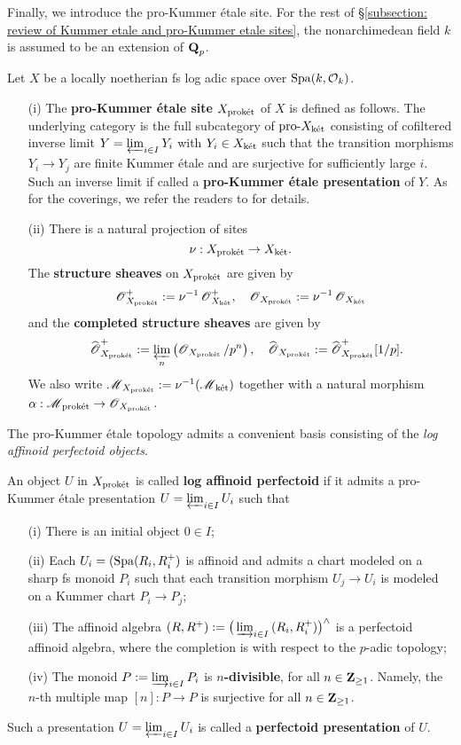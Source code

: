 Finally, we introduce the pro-Kummer \'etale site. For the rest of \S \ref{subsection: review of Kummer etale and pro-Kummer etale sites}, the nonarchimedean field $k$ is assumed to be an extension of $\operatorname{\mathbf{Q}}_p$. 
\begin{Definition}
Let $X$ be a locally noetherian fs log adic space over $\operatorname{Spa}(k,\operatorname{\mathcal{O}}_k)$.
\begin{enumerate}
\item[(i)] The \textbf{pro-Kummer \'{e}tale site} $X_{\operatorname{\textrm{prok\'{e}t}}}$ of $X$ is defined as follows. The underlying category is the full subcategory of $\textrm{pro-}X_{\operatorname{\textrm{k\'{e}t}}}$ consisting of cofiltered inverse limit $Y=\varprojlim_{i\in I}Y_i$ with $Y_i\in X_{\operatorname{\textrm{k\'{e}t}}}$ such that the transition morphisms $Y_i\rightarrow Y_j$ are finite Kummer \'{e}tale and are surjective for sufficiently large $i$. Such an inverse limit if called a \textbf{pro-Kummer \'etale presentation} of $Y$. As for the coverings, we refer the readers to \cite[Definition 5.1.1, 5.1.2]{Diao} for details.
\item[(ii)] There is a natural projection of sites \[\nu: X_{\operatorname{\textrm{prok\'{e}t}}}\rightarrow X_{\operatorname{\textrm{k\'{e}t}}}.\] The \textbf{structure sheaves} on $X_{\operatorname{\textrm{prok\'{e}t}}}$ are given by
$$
\operatorname{\mathscr{O}}_{X_{\operatorname{\textrm{prok\'{e}t}}}}^+:=\nu^{-1}\operatorname{\mathscr{O}}_{X_{\operatorname{\textrm{k\'{e}t}}}}^+, \quad \operatorname{\mathscr{O}}_{X_{\operatorname{\textrm{prok\'{e}t}}}}:=\nu^{-1}\operatorname{\mathscr{O}}_{X_{\operatorname{\textrm{k\'{e}t}}}}$$
and the \textbf{completed structure sheaves} are given by
$$
\quad \widehat{\operatorname{\mathscr{O}}}_{X_{\operatorname{\textrm{prok\'{e}t}}}}^+:=\varprojlim_{n}\left(\operatorname{\mathscr{O}}_{X_{\operatorname{\textrm{prok\'{e}t}}}}/p^n\right), \quad \widehat{\operatorname{\mathscr{O}}}_{X_{\operatorname{\textrm{prok\'{e}t}}}}:=\widehat{\operatorname{\mathscr{O}}}_{X_{\operatorname{\textrm{prok\'{e}t}}}}^+[1/p].
$$
We also write $\operatorname{\mathscr{M}}_{X_{\operatorname{\textrm{prok\'{e}t}}}}:=\nu^{-1}(\operatorname{\mathscr{M}}_{\operatorname{\textrm{k\'{e}t}}})$ together with a natural morphism $\alpha:\operatorname{\mathscr{M}}_{\operatorname{\textrm{prok\'{e}t}}}\rightarrow \operatorname{\mathscr{O}}_{X_{\operatorname{\textrm{prok\'{e}t}}}}$.
\end{enumerate}
\end{Definition}
The pro-Kummer \'etale topology admits a convenient basis consisting of the \emph{log affinoid perfectoid objects}.

\begin{Definition}
An object $U$ in $X_{\operatorname{\textrm{prok\'{e}t}}}$ is called \textbf{log affinoid perfectoid} if it admits a pro-Kummer \'etale presentation $U = \varprojlim_{i \in I} U_i$ such that
\begin{enumerate}
 \item[(i)] There is an initial object $0 \in I$;
 \item[(ii)] Each $U_i= (\operatorname{Spa}(R_i, R_i^+)$ is affinoid and admits a chart modeled on a sharp fs monoid $P_i$ such that each transition morphism $U_j \rightarrow U_i$ is modeled on a Kummer chart $P_i \to P_j$;
\item[(iii)] The affinoid algebra $(R, R^+) := \big(\varinjlim_{i \in I} \, (R_i, R_i^{+})\big)^\wedge$ is a perfectoid affinoid algebra, where the completion is with respect to the $p$-adic topology;
\item[(iv)] The monoid $P := \varinjlim_{i \in I} P_i$ is \textbf{$n$-divisible}, for all $n \in \operatorname{\mathbf{Z}}_{\geq 1}$. Namely, the $n$-th multiple map $[n]:P\rightarrow P$ is surjective for all $n\in\operatorname{\mathbf{Z}}_{\geq 1}$.
    \end{enumerate}
    Such a presentation $U = \varprojlim_{i\in I} U_i$ is called a \textbf{perfectoid presentation} of $U$.
\end{Definition}

